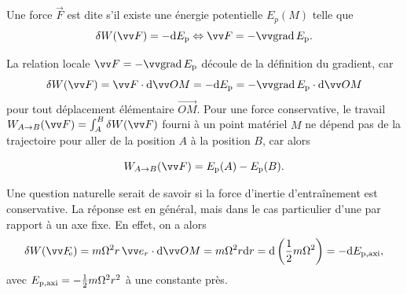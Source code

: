 \documentclass[12pt,fancy]{cours}
\begin{document}
\begin{definition}\label{def:}
Une force $\Vec{F}$ est dite  s'il existe une énergie potentielle $E_p(M)$ telle que
$$\delta W(\F) = -\d E_{\rm{p}} \Leftrightarrow \F = - \grad{E_{\rm{p}}}.$$
\end{definition}
La relation locale $\F = - \grad{E_{\rm{p}}}$ découle de la définition du gradient, car
\begin{equation}
  \delta W(\F) = \F \cdot \d  \Vec{OM} = -\d E_{\rm{p}} = - \grad E_{\rm p} \cdot \d  \Vec{OM}
\end{equation}
pour tout déplacement élémentaire $\Vec{OM}$.
Pour une force conservative, le travail $W_{A\rightarrow B}(\F) = \int_A^B \delta W(\F)$ fourni à un point matériel $M$ ne dépend pas de la trajectoire pour aller de la position $A$ à la position $B$, car alors

 \begin{equation}
  W_{A\rightarrow B}(\F) = E_{\rm p}(A) - E_{\rm p}(B).
 \end{equation}

Une question naturelle serait de savoir si la force d'inertie d'entraînement est conservative. La réponse est  en général, mais  dans le cas particulier
d'une  par rapport à un axe fixe. En effet, on a alors
\begin{equation}
\begin{split}
\delta W(\Fe) = m\Omega^2 r \,\er \cdot\d \Vec{OM} = m\Omega^2 r \d r  = \d\left(\frac{1}{2}m\Omega^2\right) = -\d E_{\rm p, axi},
\end{split}
\end{equation}
avec $E_{\rm p, axi}=-\frac{1}{2}m\Omega^2 r^2$ à une constante près.

\end{document}
